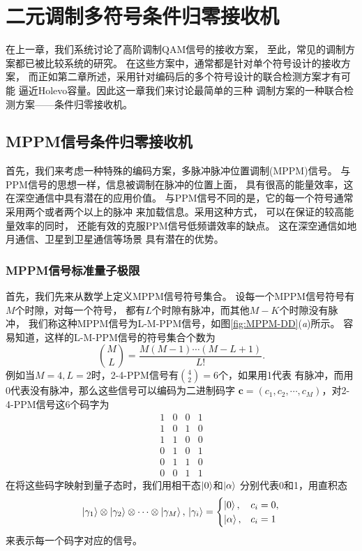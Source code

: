 \chapter{二元调制多符号条件归零接收机}
在上一章，我们系统讨论了高阶调制QAM信号的接收方案，
至此，常见的调制方案都已被比较系统的研究。
在这些方案中，通常都是针对单个符号设计的接收方案，
而正如第二章所述，采用针对编码后的多个符号设计的联合检测方案才有可能
逼近Holevo容量。因此这一章我们来讨论最简单的三种
调制方案的一种联合检测方案——条件归零接收机。


\section{MPPM信号条件归零接收机}
首先，我们来考虑一种特殊的编码方案，多脉冲脉冲位置调制(MPPM)信号。
与PPM信号的思想一样，信息被调制在脉冲的位置上面，
具有很高的能量效率，这在深空通信中具有潜在的应用价值\cite{hemmati2006deep}。
与PPM信号不同的是，它的每一个符号通常采用两个或者两个以上的脉冲
来加载信息。采用这种方式，
可以在保证的较高能量效率的同时，
还能有效的克服PPM信号低频谱效率的缺点\cite{sugiyama1989mppm}。
这在深空通信如地月通信、卫星到卫星通信等场景
具有潜在的优势\cite{hemmati2006deep,waseda2011numerical}。

\subsection{MPPM信号标准量子极限}
首先，我们先来从数学上定义MPPM信号符号集合。
设每一个MPPM信号符号有$M$个时隙，对每一个符号，
都有$L$个时隙有脉冲，而其他$M-K$个时隙没有脉冲，
我们称这种MPPM信号为L-M-PPM信号，如图\ref{fig:MPPM-DD}(\textit{a})所示。
容易知道，这样的L-M-PPM信号的符号集合个数为
\begin{equation}
\binom{M}{L} = \frac{M(M-1)\cdots(M-L+1)}{L!}.
\end{equation}
例如当$M=4, L=2$时，2-4-PPM信号有$\binom{4}{2}=6$个，如果用1代表
有脉冲，而用0代表没有脉冲，那么这些信号可以编码为二进制码字
$\bm{c} = (c_1, c_2, \cdots, c_M)$，对2-4-PPM信号这6个码字为
\begin{equation}
\begin{array}{cccc}
1 & 0 & 0 & 1 \\
1 & 0 & 1 & 0 \\
1 & 1 & 0 & 0 \\
0 & 1 & 0 & 1 \\
0 & 1 & 1 & 0 \\
0 & 0 & 1 & 1   
\end{array}
\end{equation}
在将这些码字映射到量子态时，我们用相干态$\ket{0}$和$\ket{\alpha}$
分别代表0和1，用直积态
\begin{equation}
\ket{\gamma_1}\otimes\ket{\gamma_2}\otimes\cdots\otimes\ket{\gamma_M}, \\
\ket{\gamma_i} = \begin{cases}
                    \ket{0}, & c_i=0, \\
                    \ket{\alpha}, & c_i=1
                \end{cases}
\end{equation}
来表示每一个码字对应的信号。

